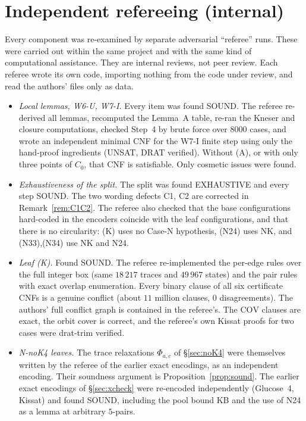 \documentclass[11pt]{amsart}
\theoremstyle{definition}
\newcommand{\Cov}{\mathrm{COV}}
\begin{document}
\section{Independent refereeing (internal)}\label{sec:referee}
Every component was re-examined by separate adversarial ``referee'' runs. These were carried out within the same project and with the same kind of computational assistance. They are internal reviews, not peer review. Each referee wrote its own code, importing nothing from the code under review, and read the authors' files only as data.
\begin{itemize}
\item \emph{Local lemmas, W6-U, W7-I.} Every item was found SOUND. The referee re-derived all lemmas, recomputed the Lemma~A table, re-ran the Kneser and closure computations, checked Step~4 by brute force over $8000$ cases, and wrote an independent minimal CNF for the W7-I finite step using only the hand-proof ingredients (UNSAT, DRAT verified). Without (A), or with only three points of $C_0$, that CNF is satisfiable. Only cosmetic issues were found.
\item \emph{Exhaustiveness of the split.} The split was found EXHAUSTIVE and every step SOUND. The two wording defects C1, C2 are corrected in Remark~\ref{rem:C1C2}. The referee also checked that the base configurations hard-coded in the encoders coincide with the leaf configurations, and that there is no circularity: (K) uses no Case-N hypothesis, (N24) uses NK, and (N33),(N34) use NK and N24.
\item \emph{Leaf (K).} Found SOUND. The referee re-implemented the per-edge rules over the full integer box (same $18\,217$ traces and $49\,967$ states) and the pair rules with exact overlap enumeration. Every binary clause of all six certificate CNFs is a genuine conflict (about $11$ million clauses, $0$ disagreements). The authors' full conflict graph is contained in the referee's. The $\Cov$ clauses are exact, the orbit cover is correct, and the referee's own Kissat proofs for two cases were drat-trim verified.
\item \emph{N-noK4 leaves.} The trace relaxations $\Phi_{a,c}$ of \S\ref{sec:noK4} were themselves written by the referee of the earlier exact encodings, as an independent encoding. Their soundness argument is Proposition~\ref{prop:sound}. The earlier exact encodings of \S\ref{sec:xcheck} were re-encoded independently (Glucose~4, Kissat) and found SOUND, including the pool bound KB and the use of N24 as a lemma at arbitrary $5$-pairs.
\end{itemize}
\end{document}
